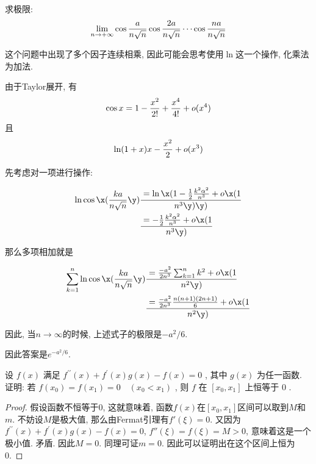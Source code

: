 
\begin{prob}  %
    求极限: 
    $$
    \lim_{n\to +\infty} \cos{a\over n\sqrt n}\cos{2a\over n\sqrt n}\cdots \cos{na\over n\sqrt n}
    $$
\end{prob} 

这个问题中出现了多个因子连续相乘, 因此可能会思考使用$\ln$这一个操作, 化乘法为加法. 

\begin{sol} 
由于Taylor展开, 有
$$
\cos x = 1-{x^2\over 2!}+{x^4\over 4!}+o(x^4)
$$ 
且
$$
\ln (1+x) x-{x^2\over 2}+o(x^3)
$$

先考虑对一项进行操作: 

$$
\begin{aligned}
    \ln \cos\x({ka\over n\sqrt{n}}\y)&=\ln\x(1-{1\over2}{k^2\alpha^2\over n^3}+o\x(1\over n^3\y)\y)\\
    &=-{1\over 2}{k^2\alpha^2\over n^3}+o\x(1\over n^3\y)
\end{aligned}
$$

那么多项相加就是

$$
\begin{aligned} %
    \sum_{k=1}^n\ln \cos\x({ka\over n\sqrt{n}}\y)&={-a^2\over 2n^3}\sum_{k=1}^n{k^2}+o\x(1\over n^2\y)\\ 
    &={-a^2\over 2n^3}{n(n+1)(2n+1)\over 6}+o\x(1\over n^2\y)
\end{aligned}
$$

因此, 当$n\to \infty$的时候, 上述式子的极限是$-a^2/6$. 

因此答案是$e^{-a^2/6}$.

\end{sol} 


\begin{prob} %
    设  $f(x)$  满足  $f^{\prime \prime}(x)+f^{\prime}(x) g(x)-f(x)=0$ , 其中  $g(x)$  为任一函数. 证明: 若  $f\left(x_{0}\right)=f\left(x_{1}\right)=0 \quad\left(x_{0}<x_{1}\right)$ , 则  $f$  在  $\left[x_{0}, x_{1}\right]$  上恒等于 $0$ .
\end{prob} 

\begin{proof}
    假设函数不恒等于$0$, 这就意味着, 函数$f(x)$在$[x_0, x_1]$区间可以取到$M$和$m$. 不妨设$M$是极大值, 那么由Fermat引理有$f'(\xi)=0$. 又因为$f^{\prime \prime}(x)+f^{\prime}(x) g(x)-f(x)=0$, $f''(\xi)=f(\xi)=M>0$, 意味着这是一个极小值. 矛盾. 因此$M=0$. 同理可证$m=0$. 因此可以证明出在这个区间上恒为0. 
\end{proof}

